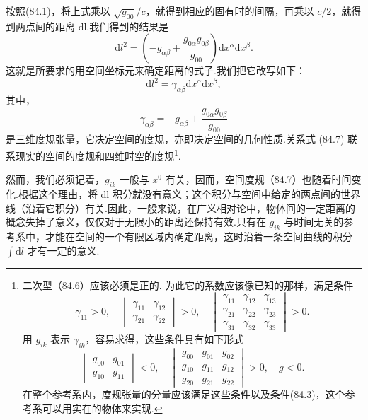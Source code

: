 按照(84.1)，将上式乘以 $\sqrt{g_{00}}/c$，就得到相应的固有时的间隔，再乘以 $c/2$，就得到两点间的距离 dl.我们得到的结果是
\begin{equation*}
  \mathrm{d}l^2=\left(-g_{\alpha\beta}
  +\frac{g_{0\alpha}g_{0\beta}}{g_{00}}\right)
  \mathrm{d}x^{\alpha}\mathrm{d}x^{\beta}.
\end{equation*}
这就是所要求的用空间坐标元来确定距离的式子.我们把它改写如下：
\begin{equation}
  \mathrm{d}l^2=\gamma_{\alpha\beta}\mathrm{d}x^{\alpha}\mathrm{d}x^{\beta},
\end{equation}
其中，
\begin{equation}
  \gamma_{\alpha\beta}=-g_{\alpha\beta}
  +\frac{g_{0\alpha}g_{0\beta}}{g_{00}}
\end{equation}
是三维度规张量，它决定空间的度规，亦即决定空间的几何性质.关系式 (84.7) 联系现实的空间的度规和四维时空的度规\footnote{二次型（84.6）应该必须是正的. 为此它的系数应该像已知的那样，满足条件
\begin{equation*}
  \gamma_{11}>0,\quad
  \begin{vmatrix}\gamma_{11} & \gamma_{12}\\ \gamma_{21} & \gamma_{22}\end{vmatrix}>0,\quad
  \begin{vmatrix}\gamma_{11} & \gamma_{12} & \gamma_{13}\\
  \gamma_{21} & \gamma_{22} & \gamma_{23}\\
  \gamma_{31} & \gamma_{32} & \gamma_{33}\end{vmatrix}>0.
\end{equation*}
用 $g_{ik}$ 表示 $\gamma_{ik}$，容易求得，这些条件具有如下形式
\begin{equation*}
  \begin{vmatrix}g_{00} & g_{01}\\ g_{10} & g_{11}\end{vmatrix}<0,\quad
  \begin{vmatrix}g_{00} & g_{01} & g_{02}\\ g_{10} & g_{11} & g_{12}\\
  g_{20} & g_{21} & g_{22}\end{vmatrix}>0,\quad g<0.
\end{equation*}
在整个参考系内，度规张量的分量应该满足这些条件以及条件(84.3)，这个参考系可以用实在的物体来实现.}.

然而，我们必须记着，$g_{ik}$ 一般与 $x^0$ 有关，因而，空间度规（84.7）也随着时间变化.根据这个理由，将 dl 积分就没有意义；这个积分与空间中给定的两点间的世界线（沿着它积分）有关.因此，一般来说，在广义相对论中，物体间的一定距离的概念失掉了意义，仅仅对于无限小的距离还保持有效.只有在 $g_{ik}$ 与时间无关的参考系中，才能在空间的一个有限区域内确定距离，这时沿着一条空间曲线的积分 $\int\mathrm{d}l$ 才有一定的意义.

